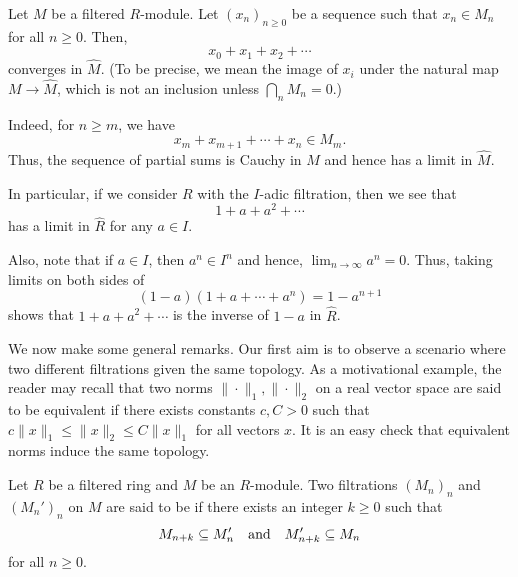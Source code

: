 \begin{obs} \label{obs:power-series-in-completion-converges}
	Let $M$ be a filtered $R$-module. Let $(x_{n})_{n \ge 0}$ be a sequence such that $x_{n} \in M_{n}$ for all $n \ge 0$. Then, 
	\begin{equation*} 
		x_{0} + x_{1} + x_{2} + \cdots
	\end{equation*}
	converges in $\widehat{M}$. (To be precise, we mean the image of $x_{i}$ under the natural map $M \to \widehat{M}$, which is not an inclusion unless $\bigcap_{n} M_{n} = 0$.)

	Indeed, for $n \ge m$, we have
	\begin{equation*} 
		x_{m} + x_{m + 1} + \cdots + x_{n} \in M_{m}.
	\end{equation*}
	Thus, the sequence of partial sums is Cauchy in $M$ and hence has a limit in $\widehat{M}$.

	In particular, if we consider $R$ with the $I$-adic filtration, then we see that
	\begin{equation*} 
		1 + a + a^{2} + \cdots
	\end{equation*}
	has a limit in $\widehat{R}$ for any $a \in I$. 

	Also, note that if $a \in I$, then $a^{n} \in I^{n}$ and hence, $\lim_{n \to \infty} a^{n} = 0$. Thus, taking limits on both sides of
	\begin{equation*} 
		(1 - a)(1 + a + \cdots + a^{n}) = 1 - a^{n + 1}
	\end{equation*}
	shows that $1 + a + a^{2} + \cdots$ is the inverse of $1 - a$ in $\widehat{R}$.
\end{obs}

We now make some general remarks. Our first aim is to observe a scenario where two different filtrations given the same topology. As a motivational example, the reader may recall that two norms $\|\cdot\|_{1}, \|\cdot\|_{2}$ on a real vector space are said to be equivalent if there exists constants $c, C > 0$ such that $c \|x\|_{1} \le \|x\|_{2} \le C \|x\|_{1}$ for all vectors $x$. It is an easy check that equivalent norms induce the same topology.

\begin{defn}
	Let $R$ be a filtered ring and $M$ be an $R$-module. Two filtrations $(M_{n})_{n}$ and $(M_{n}')_{n}$ on $M$ are said to be  if there exists an integer $k \ge 0$ such that
	\begin{equation*} 
		M_{n + k} \subseteq M_{n}' \quad\text{and}\quad M_{n + k}' \subseteq M_{n}
	\end{equation*}
	for all $n \ge 0$.
\end{defn}


